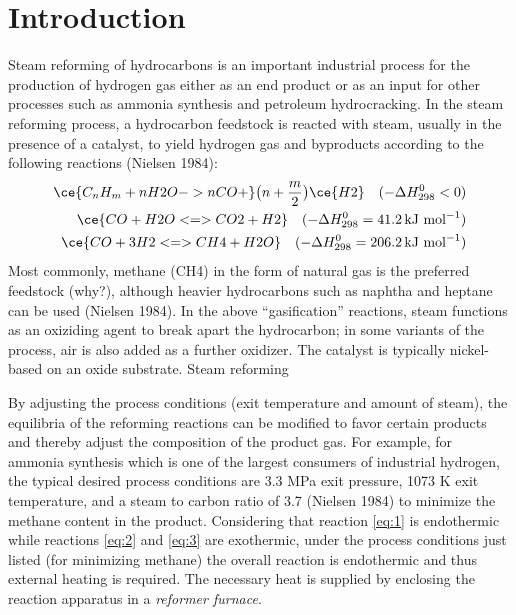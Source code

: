 \chapter{Introduction} \label{ch:introduction}

Steam reforming of hydrocarbons is an important industrial process for the production of hydrogen gas either as an end product or as an input for other processes such as ammonia synthesis and petroleum hydrocracking. In the steam reforming process, a hydrocarbon feedstock is reacted with steam, usually in the presence of a catalyst, to yield hydrogen gas and byproducts according to the following reactions (Nielsen 1984):
\begin{align}
\ce{C_{n}H_{m} + n H2O -> n CO + } \bigl(n + \frac{m}{2}\bigr) \ce{H2} \quad (-\Delta{}H^{0}_{298} < 0) \label{eq:1}\\
\ce{CO + H2O <=> CO2 + H2} \quad (-\Delta{}H^{0}_{298} = 41.2 \, \text{kJ mol}^{-1}) \label{eq:2}\\
\ce{CO + 3H2 <=> CH4 + H2O} \quad (-\Delta{}H^{0}_{298} = 206.2 \, \text{kJ mol}^{-1}) \label{eq:3}
\end{align}
Most commonly, methane (CH4) in the form of natural gas is the preferred feedstock (why?), although heavier hydrocarbons such as naphtha and heptane can be used (Nielsen 1984). In the above ``gasification'' reactions, steam functions as an oxiziding agent to break apart the hydrocarbon; in some variants of the process, air is also added as a further oxidizer. The catalyst is typically nickel-based on an oxide substrate. Steam reforming 

By adjusting the process conditions (exit temperature and amount of steam), the equilibria of the reforming reactions can be modified to favor certain products and thereby adjust the composition of the product gas. For example, for ammonia synthesis which is one of the largest consumers of industrial hydrogen, the typical desired process conditions are 3.3 MPa exit pressure, 1073 K exit temperature, and a steam to carbon ratio of 3.7 (Nielsen 1984) to minimize the methane content in the product. Considering that reaction \ref{eq:1} is endothermic while reactions \ref{eq:2} and \ref{eq:3} are exothermic, under the process conditions just listed (for minimizing methane) the overall reaction is endothermic and thus external heating is required. The necessary heat is supplied by enclosing the reaction apparatus in a \emph{reformer furnace}.

